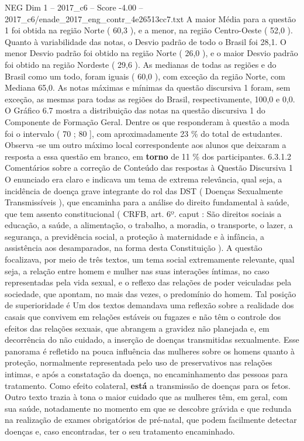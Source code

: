 \begin{textsample}{NEG Dim 1 – 2017\_c6 – Score -4.00 – 2017\_c6/enade\_2017\_eng\_contr\_4e26513cc7.txt}
A maior Média para a questão 1 foi obtida na região Norte ( 60,3 ), e a menor, na região Centro-Oeste ( 52,0 ).
Quanto à variabilidade das notas, o Desvio padrão de todo o Brasil foi 28,1.
O menor Desvio padrão foi obtido na região Norte ( 26,0 ), e o maior Desvio padrão foi obtido na região Nordeste ( 29,6 ).
As medianas de todas as regiões e do Brasil como um todo, foram iguais ( 60,0 ), com exceção da região Norte, com Mediana 65,0.
As notas máximas e mínimas da questão discursiva 1 foram, sem exceção, as mesmas para todas as regiões do Brasil, respectivamente, 100,0 e 0,0.
O Gráfico 6.7 mostra a distribuição das notas na questão discursiva 1 do Componente de Formação Geral.
Dentre os que responderam à questão a moda foi o intervalo ( 70 ; 80 ], com aproximadamente 23 \% do total de estudantes.
Observa -se um outro máximo local correspondente aos alunos que deixaram a resposta a essa questão em branco, em \textbf{torno} de 11 \% dos participantes. 6.3.1.2 Comentários sobre a correção de Conteúdo das respostas à Questão Discursiva 1 O enunciado era claro e indicava um tema de extrema relevância, qual seja, a incidência de doença grave integrante do rol das DST ( Doenças Sexualmente Transmissíveis ), que encaminha para a análise do direito fundamental à saúde, que tem assento constitucional ( CRFB, art. 6º. caput : São direitos sociais a educação, a saúde, a alimentação, o trabalho, a moradia, o transporte, o lazer, a segurança, a previdência social, a proteção à maternidade e à infância, a assistência aos desamparados, na forma desta Constituição ).
A questão focalizava, por meio de três textos, um tema social extremamente relevante, qual seja, a relação entre homem e mulher nas suas interações íntimas, no caso representadas pela vida sexual, e o reflexo das relações de poder veiculadas pela sociedade, que apontam, no mais das vezes, o predomínio do homem.
Tal posição de superioridade é Um dos textos demandava uma reflexão sobre a realidade dos casais que convivem em relações estáveis ou fugazes e não têm o controle dos efeitos das relações sexuais, que abrangem a gravidez não planejada e, em decorrência do não cuidado, a inserção de doenças transmitidas sexualmente.
Esse panorama é refletido na pouca influência das mulheres sobre os homens quanto à proteção, normalmente representada pelo uso de preservativos nas relações intimas, e após a constatação da doença, no encaminhamento das pessoas para tratamento.
Como efeito colateral, \textbf{está} a transmissão de doenças para os fetos.
Outro texto trazia à tona o maior cuidado que as mulheres têm, em geral, com sua saúde, notadamente no momento em que se descobre grávida e que redunda na realização de exames obrigatórios de pré-natal, que podem facilmente detectar doenças e, caso encontradas, ter o seu tratamento encaminhado.

\end{textsample}
